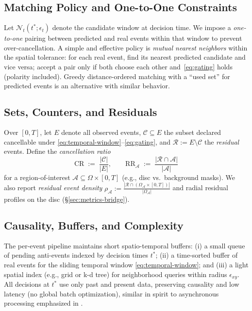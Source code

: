 \subsection{Matching Policy and One-to-One Constraints}
Let $\mathcal{N}_t(t^*;\epsilon_t)$ denote the candidate window at decision time. We impose a \emph{one-to-one} pairing between predicted and real events within that window to prevent over-cancellation. A simple and effective policy is \emph{mutual nearest neighbors} within the spatial tolerance: for each real event, find its nearest predicted candidate and vice versa; accept a pair only if both choose each other and~\eqref{eq:gating} holds (polarity included). Greedy distance-ordered matching with a ``used set'' for predicted events is an alternative with similar behavior.

\subsection{Sets, Counters, and Residuals}
Over $[0,T]$, let $E$ denote all observed events, $\mathcal{C}\subseteq E$ the subset declared cancellable under \eqref{eq:temporal-window}--\eqref{eq:gating}, and $\mathcal{R} := E \setminus \mathcal{C}$ the \emph{residual} events. Define the \emph{cancellation ratio}
\begin{equation}
\mathrm{CR} \;:=\; \frac{|\mathcal{C}|}{|E|},
\qquad
\mathrm{RR}_\mathcal{A} \;:=\; \frac{|\mathcal{R}\cap \mathcal{A}|}{|\mathcal{A}|}
\label{eq:cr-rr}
\end{equation}
for a region-of-interest $\mathcal{A}\subseteq \Omega\times[0,T]$ (e.g., disc vs.\ background masks). We also report \emph{residual event density} $\rho_\mathcal{A} := \frac{|\mathcal{R}\cap (\Omega_\mathcal{A}\times[0,T])|}{|\Omega_\mathcal{A}|}$ and radial residual profiles on the disc (\S\ref{sec:metrics-bridge}).

\subsection{Causality, Buffers, and Complexity}
The per-event pipeline maintains short spatio-temporal buffers: (i) a small queue of pending anti-events indexed by decision times $t^*$; (ii) a time-sorted buffer of real events for the sliding temporal window \eqref{eq:temporal-window}; and (iii) a light spatial index (e.g., grid or k-d tree) for neighborhood queries within radius $\epsilon_{xy}$. All decisions at $t^*$ use only past and present data, preserving causality and low latency (no global batch optimization), similar in spirit to asynchronous processing emphasized in \cite{Wang2025Thesis,Scheerlinck2021Thesis}.


